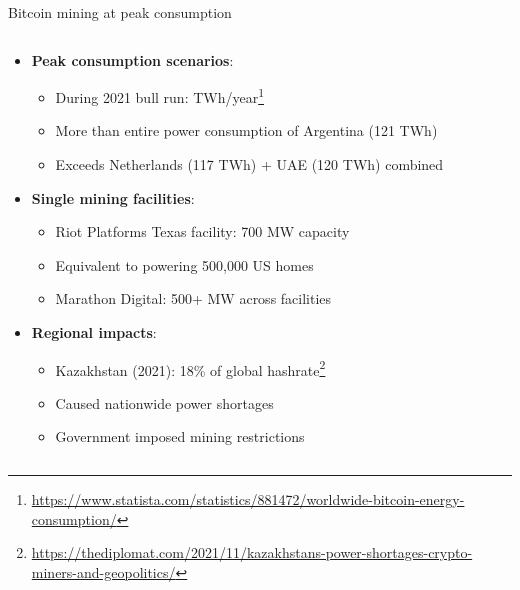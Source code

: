 \documentclass[aspectratio=169, lualatex, handout]{beamer}
\begin{document}
\begin{frame}{Bitcoin mining at peak consumption}
	\begin{columns}[c]
		\begin{column}{1\textwidth}
			\begin{itemize}
				\item \textbf{Peak consumption scenarios}:
				      \begin{itemize}
					      \item During 2021 bull run:  TWh/year\footnote{\url{https://www.statista.com/statistics/881472/worldwide-bitcoin-energy-consumption/}}
					      \item More than entire power consumption of Argentina (121 TWh)
					      \item Exceeds Netherlands (117 TWh) + UAE (120 TWh) combined
				      \end{itemize}
				\item \textbf{Single mining facilities}:
				      \begin{itemize}
					      \item Riot Platforms Texas facility: 700 MW capacity
					      \item Equivalent to powering 500,000 US homes
					      \item Marathon Digital: 500+ MW across facilities
				      \end{itemize}
				\item \textbf{Regional impacts}:
				      \begin{itemize}
					      \item Kazakhstan (2021): 18\% of global hashrate\footnote{\url{https://thediplomat.com/2021/11/kazakhstans-power-shortages-crypto-miners-and-geopolitics/}}
					      \item Caused nationwide power shortages
					      \item Government imposed mining restrictions
				      \end{itemize}
			\end{itemize}
		\end{column}
	\end{columns}
\end{frame}
\end{document}
